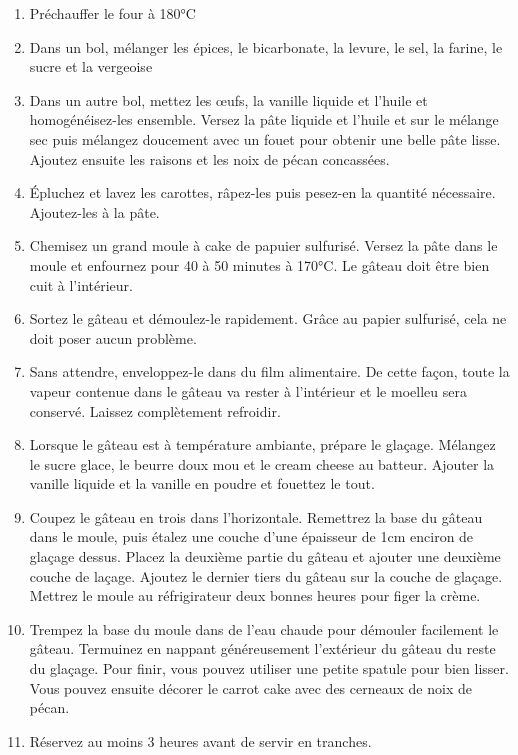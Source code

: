 {\begin{enumerate}
	\item Préchauffer le four à 180°C
	\item Dans un bol, mélanger les épices, le bicarbonate, la levure, le sel, la farine, le sucre et la vergeoise
	\item Dans un autre bol, mettez les \oe ufs, la vanille liquide et l'huile et homogénéisez-les ensemble. Versez la pâte liquide et l'huile et sur le mélange sec puis mélangez doucement avec un fouet pour obtenir une belle pâte lisse. Ajoutez ensuite les raisons et les noix de pécan concassées.
	\item Épluchez et lavez les carottes, râpez-les puis pesez-en la quantité nécessaire. Ajoutez-les à la pâte.
	\item Chemisez un grand moule à cake de papuier sulfurisé. Versez la pâte dans le moule et enfournez pour 40 à 50 minutes à 170°C. Le gâteau doit être bien cuit à l'intérieur.
	\item Sortez le gâteau et démoulez-le rapidement. Grâce au papier sulfurisé, cela ne doit poser aucun problème.
	\item Sans attendre, enveloppez-le dans du film alimentaire. De cette façon, toute la vapeur contenue dans le gâteau va rester à l'intérieur et le moelleu sera conservé. Laissez complètement refroidir.
	\item Lorsque le gâteau est à température ambiante, prépare le glaçage. Mélangez le sucre glace, le beurre doux mou et le cream cheese au batteur. Ajouter la vanille liquide et la vanille en poudre et fouettez le tout. 
	\item Coupez le gâteau en trois dans l'horizontale. Remettrez la base du gâteau dans le moule, puis étalez une couche d'une épaisseur de 1cm enciron de glaçage dessus. Placez la deuxième partie du gâteau et ajouter une deuxième couche de laçage. Ajoutez le dernier tiers du gâteau sur la couche de glaçage. Mettrez le moule au réfrigirateur deux bonnes heures pour figer la crème.
	\item Trempez la base du moule dans de l'eau chaude pour démouler facilement le gâteau. Termuinez en nappant généreusement l'extérieur du gâteau du reste du glaçage. Pour finir, vous pouvez utiliser une petite spatule pour bien lisser. Vous pouvez ensuite décorer le carrot cake avec des cerneaux de noix de pécan.
	\item Réservez au moins 3 heures avant de servir en tranches.
\end{enumerate}}

